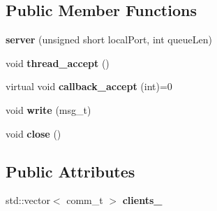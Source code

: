 \subsection*{\-Public \-Member \-Functions}
\begin{DoxyCompactItemize}
\item 
\hypertarget{classgal_1_1network_1_1server_ab1860e93b988732894591fc5c732b1c0}{{\bfseries server} (unsigned short local\-Port, int queue\-Len)}\label{classgal_1_1network_1_1server_ab1860e93b988732894591fc5c732b1c0}

\item 
\hypertarget{classgal_1_1network_1_1server_a15ed05d13f3c164f019319bbf919461e}{void {\bfseries thread\-\_\-accept} ()}\label{classgal_1_1network_1_1server_a15ed05d13f3c164f019319bbf919461e}

\item 
\hypertarget{classgal_1_1network_1_1server_a1914e60f0ced29f6ef1960b00c1ec0c5}{virtual void {\bfseries callback\-\_\-accept} (int)=0}\label{classgal_1_1network_1_1server_a1914e60f0ced29f6ef1960b00c1ec0c5}

\item 
\hypertarget{classgal_1_1network_1_1server_aa2c98b69e7429a6811ce7e8ac959ceec}{void {\bfseries write} (msg\-\_\-t)}\label{classgal_1_1network_1_1server_aa2c98b69e7429a6811ce7e8ac959ceec}

\item 
\hypertarget{classgal_1_1network_1_1server_a338a20b03a964019c062111791c41873}{void {\bfseries close} ()}\label{classgal_1_1network_1_1server_a338a20b03a964019c062111791c41873}

\end{DoxyCompactItemize}
\subsection*{\-Public \-Attributes}
\begin{DoxyCompactItemize}
\item 
\hypertarget{classgal_1_1network_1_1server_a4de485e44eab83025b8fd34b7b3c6928}{std\-::vector$<$ comm\-\_\-t $>$ {\bfseries clients\-\_\-}}\label{classgal_1_1network_1_1server_a4de485e44eab83025b8fd34b7b3c6928}

\end{DoxyCompactItemize}

